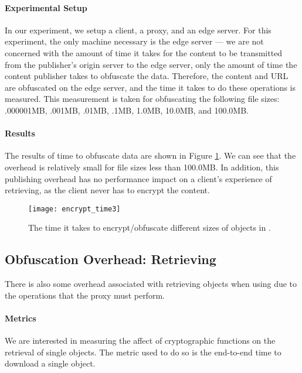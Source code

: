 \paragraph{Experimental Setup}
In our experiment, we setup a client, a proxy, and an edge server. For this experiment, the only machine necessary is 
the edge server --- we are not concerned with the amount of time it takes for the content to be transmitted from 
the publisher's origin server to the edge server, only the amount of time the content publisher takes to obfuscate the data.  Therefore, 
the content and URL are obfuscated on the edge server, and the time it takes to do these operations is measured.  This 
measurement is taken for obfuscating the following file sizes: .000001MB, .001MB, .01MB, .1MB, 1.0MB, 10.0MB, and 100.0MB. \\

\paragraph{Results}
The results of time to obfuscate data are shown in Figure \ref{fig:encrypt_time}.  We can see that the overhead 
is relatively small for file sizes less than 100.0MB.  In addition, this publishing overhead has no performance impact 
on a client's experience of retrieving, as the client never has to encrypt the content.  

\begin{figure}[t]
\centering
\texttt{[image: encrypt\_time3]}
\caption{The time it takes to encrypt/obfuscate different sizes of objects in \system{}.}
\label{fig:encrypt_time}
\end{figure}

\subsection{Obfuscation Overhead: Retrieving}
There is also some overhead associated with retrieving objects when using \system{} due to the operations that 
the proxy must perform.  \\

\paragraph{Metrics}
We are interested in measuring the affect of cryptographic functions on the retrieval of single 
objects.  The metric used to do so is the end-to-end time to download a single object.  \\

